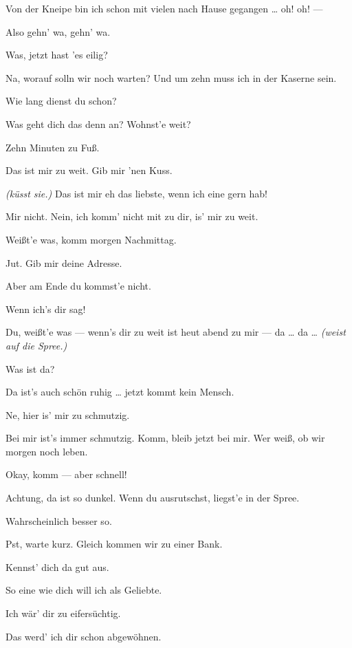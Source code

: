 \documentclass[
	final,
	a4paper,
	ngerman,
	mpinclude = true, %
	twoside = true,
	open = right,
	cleardoublepage = plain,
	DIV = 13,
	BCOR = 1cm,
	titlepage = firstiscover,
	]{scrbook}
\newcommand{\direction}[1]{\textit{(#1)}}
\newcommand{\thecharacter}[1]{\textup{\textsc{#1}}\xspace}
\newcommand{\thenutte}{\thecharacter{Leocadia}}
\newcommand{\thesoldatin}{\thecharacter{Franziska}}
\newcommand{\character}[1]{\item[#1:]}
\newcommand{\nutte}{\character{\thenutte}}
\newcommand{\soldatin}{\character{\thesoldatin}}
\begin{document}
\begin{play}
	\nutte
	Von der Kneipe bin ich schon mit vielen nach Hause gegangen \ldots{} oh! oh! ---

	\soldatin
	Also gehn' wa, gehn' wa.

	\nutte
	Was, jetzt hast 'es eilig?

	\soldatin
	Na, worauf solln wir noch warten? Und um zehn muss ich in der Kaserne sein.

	\nutte
	Wie lang dienst du schon?

	\soldatin
	Was geht dich das denn an? Wohnst'e weit?

	\nutte
	Zehn Minuten zu Fuß.

	\soldatin
	Das ist mir zu weit. Gib mir 'nen Kuss.

	\nutte
	\direction{küsst sie.} Das ist mir eh das liebste, wenn ich eine gern hab!

	\soldatin
	Mir nicht. Nein, ich komm' nicht mit zu dir, is' mir zu weit.

	\nutte
	Weißt'e was, komm morgen Nachmittag.

	\soldatin
	Jut. Gib mir deine Adresse.

	\nutte
	Aber am Ende du kommst'e nicht.

	\soldatin
	Wenn ich's dir sag!

	\nutte
	Du, weißt'e was --- wenn's dir zu weit ist heut abend zu mir --- da \ldots{} da \ldots{} \direction{weist auf die Spree.}

	\soldatin
	Was ist da?

	\nutte
	Da ist's auch schön ruhig \ldots{} jetzt kommt kein Mensch.

	\soldatin
	Ne, hier is' mir zu schmutzig.

	\nutte
	Bei mir ist's immer schmutzig. Komm, bleib jetzt bei mir. Wer weiß, ob wir morgen noch leben.

	\soldatin
	Okay, komm --- aber schnell!

	\nutte
	Achtung, da ist so dunkel. Wenn du ausrutschst, liegst'e in der Spree.

	\soldatin
	Wahrscheinlich besser so.

	\nutte
	Pst, warte kurz. Gleich kommen wir zu einer Bank.

	\soldatin
	Kennst' dich da gut aus.

	\nutte
	So eine wie dich will ich als Geliebte.

	\soldatin
	Ich wär' dir zu eifersüchtig.

	\nutte
	Das werd' ich dir schon abgewöhnen.


\end{play}
\end{document}

